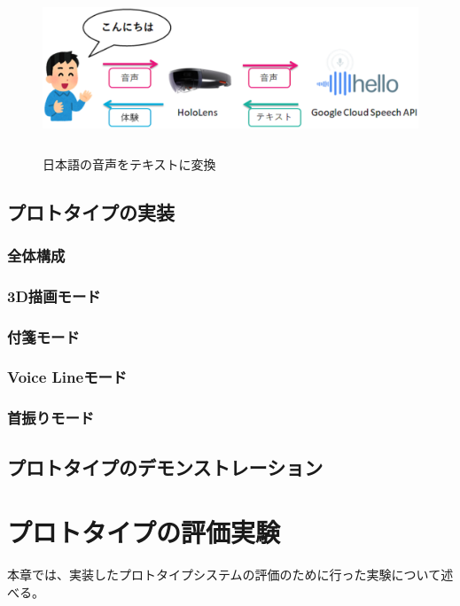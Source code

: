 \documentclass[11pt,a4j, titlepage]{jarticle} %
\begin{document}
\begin{figure}[H]
  \begin{center}
    \includegraphics[clip,height=5.0cm,width=14.0cm]{./googlespeech.eps}
    \caption{日本語の音声をテキストに変換}
    \label{fig:googlespeech}
  \end{center}
\end{figure}

\subsection{プロトタイプの実装}

\subsubsection{全体構成}

\subsubsection{3D描画モード}

\subsubsection{付箋モード}

\subsubsection{Voice Lineモード}

\subsubsection{首振りモード}

\subsection{プロトタイプのデモンストレーション}

\newpage
\section{プロトタイプの評価実験}
本章では、実装したプロトタイプシステムの評価のために行った実験について述べる。
\end{document}
